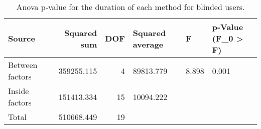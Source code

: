 
\begin{table}[!htb]
\centering
\caption{Anova p-value for the duration of each method for blinded users.}
\label{tab:anova_duration_var}
\begin{tabular}{lrrlll}
\toprule
         Source &  Squared sum &  DOF & Squared average &     F & p-Value (F\_0 > F) \\
\midrule
Between factors &   359255.115 &    4 &       89813.779 & 8.898 &             0.001 \\
 Inside factors &   151413.334 &   15 &       10094.222 &       &                   \\
          Total &   510668.449 &   19 &                 &       &                   \\
\bottomrule
\end{tabular}
\end{table}

